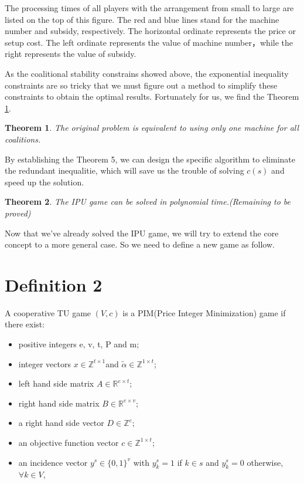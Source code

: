 \documentclass[UTF8]{article}
\newtheorem{thm}{\hspace{2em}Theorem}
\begin{document}
The processing times of all players with the arrangement from small to large are listed on the top of this figure.
The red and blue lines stand for the machine number and subsidy, respectively.
The horizontal ordinate represents the price or setup cost.
The left ordinate represents the value of machine number，while the right represents the value of subsidy.

As the coalitional stability constrains showed above, the exponential inequality constraints are so tricky that we must figure out a method to simplify these constraints to obtain the optimal results. Fortunately for us, we find the Theorem \ref{thm5}.


\begin{thm}\label{thm5}
The original problem is equivalent to using only one machine for all coalitions.

\end{thm}

By establishing the Theorem 5, we can design the specific algorithm to eliminate the redundant inequalitie, which will save us the trouble of solving $c(s)$ and speed up the solution.

\begin{thm}\label{thm6}
The IPU game can be solved in polynomial time.(Remaining to be proved)
\end{thm}

Now that we've already solved the IPU game, we will try to extend the core concept to a more general case. So we need to define a new game as follow.

\section*{Definition 2}

A cooperative TU game $(V,c)$ is a PIM(Price Integer Minimization) game if there exist:

\begin{itemize}
	\item positive integers e, v, t, P and m;
	\item integer vectors $ x \in \mathbb{Z}^{t \times 1} $and $ \tilde{\alpha} \in \mathbb{Z}^{1 \times t} $;
	\item left hand side matrix  $A \in \mathbb{R} ^{e \times t};$
	\item right hand side matrix $B \in \mathbb{R} ^ {e \times v};$
	\item a right hand side vector $D \in \mathbb{Z} ^ {e};$
	\item an objective function vector
	$c \in \mathbb{Z}^{1 \times t};$
	\item an incidence vector $y^s \in \{0,1\}^v$ with $y^s_k = 1$ if $k \in s$ and $y^s_k = 0 $ otherwise, $\forall k \in V$,

\end{itemize}
\end{document}
